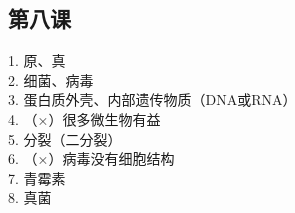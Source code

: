 \documentclass[a4paper,12pt]{ctexart}
\begin{document}
\subsection*{第八课}
1. 原、真\\
2. 细菌、病毒\\
3. 蛋白质外壳、内部遗传物质（DNA或RNA）\\
4. （×）很多微生物有益\\
5. 分裂（二分裂）\\
6. （×）病毒没有细胞结构\\
7. 青霉素\\
8. 真菌
\end{document}

